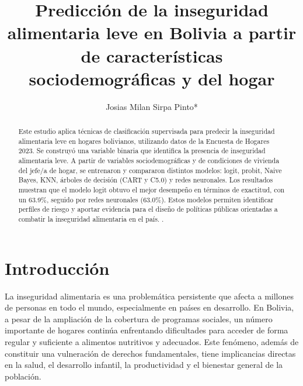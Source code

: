 \documentclass[Royal,times,sageh]{sagej}
\begin{document}

\title{Predicción de la inseguridad alimentaria leve en Bolivia a partir
de características sociodemográficas y del hogar}


\author{Josias Milan Sirpa Pinto*}




\begin{abstract}
Este estudio aplica técnicas de clasificación supervisada para predecir
la inseguridad alimentaria leve en hogares bolivianos, utilizando datos
de la Encuesta de Hogares 2023. Se construyó una variable binaria que
identifica la presencia de inseguridad alimentaria leve. A partir de
variables sociodemográficas y de condiciones de vivienda del jefe/a de
hogar, se entrenaron y compararon distintos modelos: logit, probit,
Naive Bayes, KNN, árboles de decisión (CART y C5.0) y redes neuronales.
Los resultados muestran que el modelo logit obtuvo el mejor desempeño en
términos de exactitud, con un 63.9\%, seguido por redes neuronales
(63.0\%). Estos modelos permiten identificar perfiles de riesgo y
aportar evidencia para el diseño de políticas públicas orientadas a
combatir la inseguridad alimentaria en el país. .
\end{abstract}


\maketitle

\newpage

\section{Introducción}\label{introducciuxf3n}

La inseguridad alimentaria es una problemática persistente que afecta a
millones de personas en todo el mundo, especialmente en países en
desarrollo. En Bolivia, a pesar de la ampliación de la cobertura de
programas sociales, un número importante de hogares continúa enfrentando
dificultades para acceder de forma regular y suficiente a alimentos
nutritivos y adecuados. Este fenómeno, además de constituir una
vulneración de derechos fundamentales, tiene implicancias directas en la
salud, el desarrollo infantil, la productividad y el bienestar general
de la población.
\end{document}
